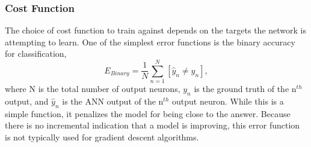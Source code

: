 


\subsubsection{Cost Function}

The choice of cost function to train against depends on the targets the network is attempting to learn. One of the simplest error functions is the binary accuracy for classification, 
%
\begin{equation} \label{eq:Binary_accuracy}
E_{Binary} = {\frac{1} N} \sum_{n=1}^N [\hat{y}_n \neq y_n ],
\end{equation}
%
where N is the total number of output neurons, $y_n$ is the ground truth of the n$^{th}$ output, and $\hat{y}_n$ is the ANN output of the n$^{th}$ output neuron. While this is a simple function, it penalizes the model for being close to the answer. Because there is no incremental indication that a model is improving, this error function is not typically used for gradient descent algorithms.

